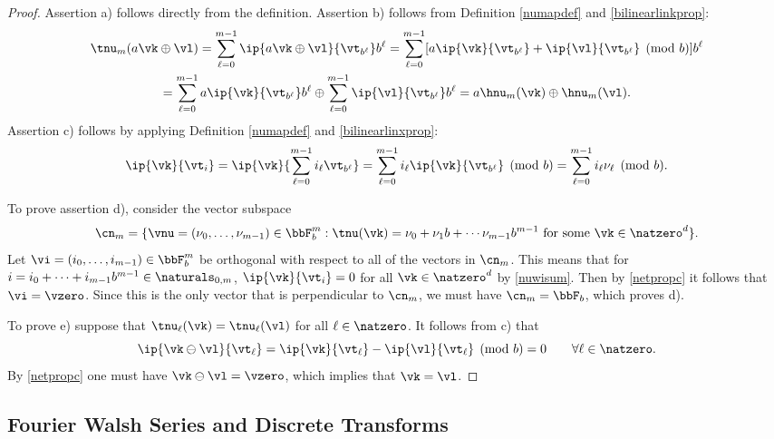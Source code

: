 \documentclass[]{elsarticle}
\theoremstyle{definition}
\renewcommand{\bbK}{\natzero^d}
\newcommand{\natm}{\naturals_{0,m}}
\begin{document}
\begin{proof} Assertion a) follows directly from the definition.  Assertion b) follows from Definition \ref{numapdef} and \eqref{bilinearlinkprop}: 
\begin{multline*}
\tnu_m(a\vk \oplus \vl)= \sum_{\ell=0}^{m-1} \ip{a\vk \oplus \vl}{\vt_{b^\ell}} b^{\ell}  = \sum_{\ell=0}^{m-1} [a\ip{\vk}{\vt_{b^\ell}} + \ip{\vl}{\vt_{b^\ell}} \pmod b] b^{\ell}  \\ 
= \sum_{\ell=0}^{m-1} a\ip{\vk}{\vt_{b^\ell}}b^{\ell}  \oplus \sum_{\ell=0}^{m-1}  \ip{\vl}{\vt_{b^\ell}} b^{\ell} 
= a\hnu_m(\vk) \oplus \hnu_m(\vl).
\end{multline*}
Assertion c) follows by applying  Definition \ref{numapdef} and \eqref{bilinearlinxprop}:
\[
\ip{\vk}{\vt_i} = \ip{\vk}{\sum_{\ell=0}^{m-1} i_\ell \vt_{b^{\ell}}} = \sum_{\ell=0}^{m-1} i_\ell \ip{\vk}{\vt_{b^{\ell}}} \pmod b = \sum_{\ell=0}^{m-1} i_\ell \nu_\ell \pmod b.
\]

To prove assertion d), consider the vector subspace
\[
\cn_m = \{\vnu=(\nu_0, \ldots, \nu_{m-1}) \in \bbF_b^m : \tnu(\vk) = \nu_0 + \nu_1 b + \cdots \nu_{m-1} b^{m-1} \text{ for some } \vk \in \bbK\}.
\]
Let $\vi=(i_0, \ldots, i_{m-1}) \in \bbF_b^m$ be orthogonal with respect to all of the vectors in $\cn_m$.  This means that for $i=i_0 + \cdots + i_{m-1}b^{m-1} \in \natm$,   $\ip{\vk}{\vt_i}=0$ for all $\vk \in \bbK$ by \eqref{nuwisum}.  Then by \eqref{netpropc} it follows that $\vi=\vzero$.  Since this is the only vector that is perpendicular to $\cn_m$, we must have $\cn_m=\bbF_b$, which proves d).

To prove e) suppose that $\tnu_\ell(\vk)=\tnu_\ell(\vl)$ for all $\ell \in \natzero$.  It follows from c) that 
\[
\ip{\vk\ominus\vl}{\vt_\ell} = \ip{\vk}{\vt_\ell} - \ip{\vl}{\vt_\ell} \pmod b = 0 \qquad \forall \ell \in \natzero.
\]
By \eqref{netpropc} one must have $\vk\ominus\vl=\vzero$, which implies that $\vk=\vl$. 
\end{proof}

\subsection{Fourier Walsh Series and Discrete Transforms}
\end{document}
